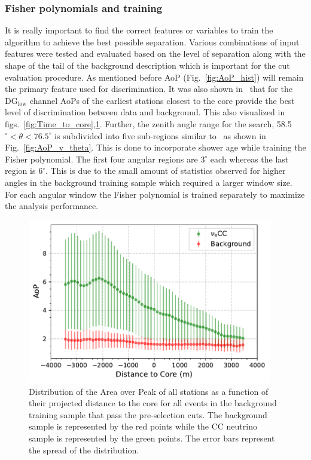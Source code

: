 \subsubsection{Fisher polynomials and training}
\label{subsubsec:nu_sel_fisher_training}
It is really important to find the correct features or variables to train the algorithm to achieve the best possible separation. Various combinations of input features were tested and evaluated based on the level of separation along with the shape of the tail of the background description which is important for the cut evaluation procedure. As mentioned before AoP (Fig.~\ref{fig:AoP_hist}) will remain the primary feature used for discrimination. It was also shown in~\cite{gap_note_2013} that for the DG$\mathrm{_{low}}$ channel AoPs of the earliest stations closest to the core provide the best level of discrimination between data and background. This also visualized in figs.~\ref{fig:Time_to_core},\ref{fig:Dist_to_core}. Further, the zenith angle range for the search, 58.5$^\circ < \theta < 76.5^\circ$ is subdivided into five sub-regions similar to~\cite{gap_note_2013} as shown in Fig.~\ref{fig:AoP_v_theta}. This is done to incorporate shower age while training the Fisher polynomial. The first four angular regions are $3^\circ$ each whereas the last region is $6^\circ$. This is due to the small amount of statistics observed for higher angles in the background training sample which required a larger window size. For each angular window the Fisher polynomial is trained separately to maximize the analysis performance. 

\begin{figure}[t!]
  \centering
  \includegraphics[width=0.95\textwidth]{thesis_figures/Nu_analysis/Selection_Evo_AoP_Dist_mean_CC_redcut.pdf}
  \caption{Distribution of the Area over Peak of all stations as a function of their projected distance to the core for all events in the background training sample that pass the pre-selection cuts. The background sample is represented by the red points while the CC neutrino sample is represented by the green points. The error bars represent the spread of the distribution.}
  \label{fig:Dist_to_core}
\end{figure}

